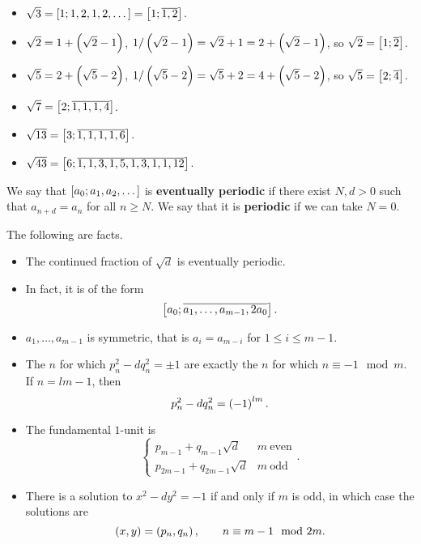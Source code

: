 \begin{example*}
\hfill
\begin{itemize}
\item $ \sqrt{3} = \sbr{1; 1, 2, 1, 2, \dots} = \sbr{1; \overline{1, 2}} $.
\item $ \sqrt{2} = 1 + \br{\sqrt{2} - 1} $, $ 1 / \br{\sqrt{2} - 1} = \sqrt{2} + 1 = 2 + \br{\sqrt{2} - 1} $, so $ \sqrt{2} = \sbr{1; \overline{2}} $.
\item $ \sqrt{5} = 2 + \br{\sqrt{5} - 2} $, $ 1 / \br{\sqrt{5} - 2} = \sqrt{5} + 2 = 4 + \br{\sqrt{5} - 2} $, so $ \sqrt{5} = \sbr{2; \overline{4}} $.
\item $ \sqrt{7} = \sbr{2; \overline{1, 1, 1, 4}} $.
\item $ \sqrt{13} = \sbr{3; \overline{1, 1, 1, 1, 6}} $.
\item $ \sqrt{43} = \sbr{6; \overline{1, 1, 3, 1, 5, 1, 3, 1, 1, 12}} $.
\end{itemize}
\end{example*}

\begin{definition}
We say that $ \sbr{a_0; a_1, a_2, \dots} $ is \textbf{eventually periodic} if there exist $ N, d > 0 $ such that $ a_{n + d} = a_n $ for all $ n \ge N $. We say that it is \textbf{periodic} if we can take $ N = 0 $.
\end{definition}

\begin{fact}
The following are facts.
\begin{itemize}
\item The continued fraction of $ \sqrt{d} $ is eventually periodic.
\item In fact, it is of the form
$$ \sbr{a_0; \overline{a_1, \dots, a_{m - 1}, 2a_0}}. $$
\item $ a_1, \dots, a_{m - 1} $ is symmetric, that is $ a_i = a_{m - i} $ for $ 1 \le i \le m - 1 $.
\item The $ n $ for which $ p_n^2 - dq_n^2 = \pm 1 $ are exactly the $ n $ for which $ n \equiv -1 \mod m $. If $ n = lm - 1 $, then
$$ p_n^2 - dq_n^2 = \br{-1}^{lm}. $$
\item The fundamental $ 1 $-unit is
$$
\begin{cases}
p_{m - 1} + q_{m - 1}\sqrt{d} & m \ \text{even} \\
p_{2m - 1} + q_{2m - 1}\sqrt{d} & m \ \text{odd}
\end{cases}.
$$
\item There is a solution to $ x^2 - dy^2 = -1 $ if and only if $ m $ is odd, in which case the solutions are
$$ \br{x, y} = \br{p_n, q_n}, \qquad n \equiv m - 1 \mod 2m. $$
\end{itemize}
\end{fact}

